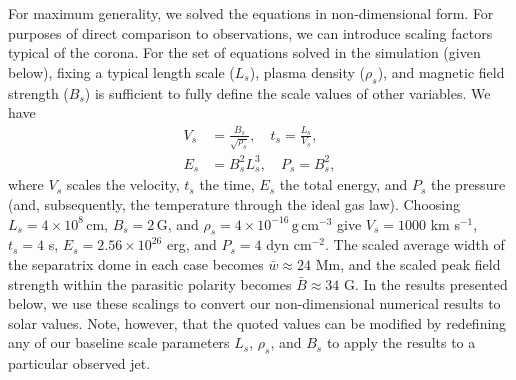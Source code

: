 \documentclass[twocolumn]{aastex6}
\begin{document}
{For maximum generality, we solved the equations in non-dimensional form. For purposes of direct comparison to observations, we can introduce scaling factors typical of the corona. {For the set of equations solved in the simulation (given below)}, fixing a typical length scale ($L_{s}$), plasma density ($\rho_{s}$), and magnetic field strength ($B_{s}$) is sufficient to fully define the scale values of other variables. We have
\begin{align}
V_s &= \frac{B_s}{\sqrt{\rho_s}}, \quad t_s = \frac{L_s}{V_s},\\
E_s &= B_s^2 L_s^3, \quad P_s = B_s^2,
\end{align}
where $V_{s}$ scales the velocity, $t_{s}$ the time, $E_{s}$ the total energy, and $P_{s}$ the pressure (and, subsequently, the temperature through the ideal gas law). Choosing $L_{s} = 4\times10^{8} \,\text{cm}$, $B_{s} = 2\,\text{G}$, and $\rho_{s} = 4\times 10^{-16} \,\text{g}\,\text{cm}^{-3}$ give $V_{s} = 1000$ km s$^{-1}$, $t_{s} = 4$ s, $E_{s} = 2.56 \times 10^{26}$ erg, and $P_{s} = 4$ dyn cm$^{-2}$. The scaled average width of the separatrix dome in each case becomes ${\bar w} \approx 24$ Mm, and the scaled peak field strength within the parasitic polarity becomes ${\bar B} \approx 34$ G. In the results presented below, we use these scalings to convert our non-dimensional numerical results to solar values. Note, however, that the quoted values can be modified by redefining any of our baseline scale parameters $L_{s}$, $\rho_{s}$, and $B_{s}$ to apply the results to a particular observed jet.}

\end{document}

